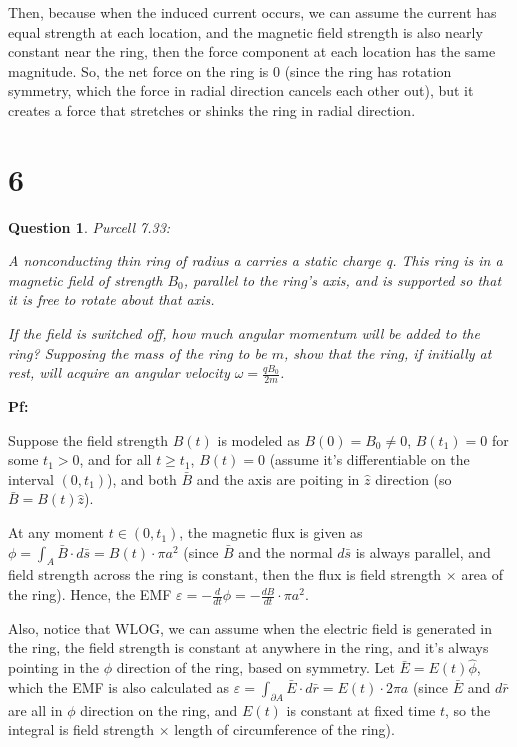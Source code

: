 \documentclass{article}
\newtheorem{question}{Question}
\begin{document}
\begin{itemize}
    Then, because when the induced current occurs, we can assume the current has equal strength at each location,
    and the magnetic field strength is also nearly constant near the ring, then the force component at each location has the same magnitude.
    So, the net force on the ring is $0$ (since the ring has rotation symmetry, which the force in radial direction cancels each other out),
    but it creates a force that stretches or shinks the ring in radial direction.
\end{itemize}

\hfill

\hfill

\section*{6}
\begin{myBox}[]{}
    \begin{question}
        Purcell 7.33:

        A nonconducting thin ring of radius a carries a static charge q.
        This ring is in a magnetic field of strength $B_0$, parallel to the ring’s
        axis, and is supported so that it is free to rotate about that axis.

        If the field is switched off, how much angular momentum will be
        added to the ring? Supposing the mass of the ring to be $m$, show
        that the ring, if initially at rest, will acquire an angular velocity
        $\omega=\frac{qB_0}{2m}$.
    \end{question}
\end{myBox}

\textbf{Pf:}

Suppose the field strength $B(t)$ is modeled as $B(0)=B_0\neq 0$, $B(t_1)=0$ for some $t_1>0$, and for all $t\geq t_1$, $B(t)=0$ (assume it's differentiable on the interval $(0,t_1)$),
and both $\bar{B}$ and the axis are poiting in $\hat{z}$ direction (so $\bar{B}=B(t)\hat{z}$).

At any moment $t\in (0,t_1)$, the magnetic flux is given as $\phi=\int_A\bar{B}\cdot d\bar{s}=B(t)\cdot \pi a^2$ 
(since $\bar{B}$ and the normal $d\bar{s}$ is always parallel, and field strength across the ring is constant, then the flux is field strength $\times$ area of the ring).
Hence, the EMF $\varepsilon = -\frac{d}{dt}\phi = -\frac{dB}{dt}\cdot \pi a^2$.

\hfill

Also, notice that WLOG, we can assume when the electric field is generated in the ring, the field strength is constant at anywhere in the ring, and it's always pointing in the $\phi$ direction of the ring, based on symmetry.
Let $\bar{E}=E(t)\hat{\phi}$, which the EMF is also calculated as $\varepsilon = \int_{\partial A}\bar{E}\cdot d\bar{r} = E(t)\cdot 2\pi a$ (since $\bar{E}$ and $d\bar{r}$ are all in $\phi$ direction on the ring, and $E(t)$ is constant
at fixed time $t$, so the integral is field strength $\times$ length of circumference of the ring).
\end{document}
